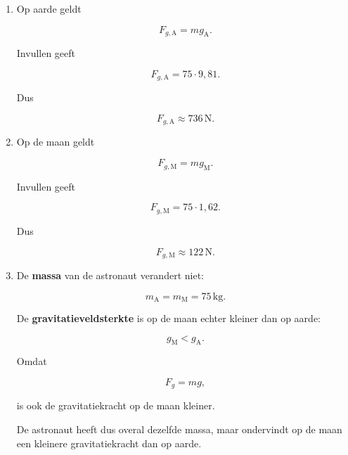\documentclass{ximera}
\begin{document}
\begin{oefening}{\oefB\ESS}
\begin{oplossing}
\begin{enumerate}
      
      \item
      Op aarde geldt
      
      \[
      F_{g,\mathrm A}
      =
      mg_{\mathrm A}.
      \]
      
      Invullen geeft
      
      \[
      F_{g,\mathrm A}
      =
      75\cdot9{,}81.
      \]
      
      Dus
      
      \[
      \boxed{
      F_{g,\mathrm A}
      \approx736\,\mathrm N.
      }
      \]
      
      
      \item
      Op de maan geldt
      
      \[
      F_{g,\mathrm M}
      =
      mg_{\mathrm M}.
      \]
      
      Invullen geeft
      
      \[
      F_{g,\mathrm M}
      =
      75\cdot1{,}62.
      \]
      
      Dus
      
      \[
      \boxed{
      F_{g,\mathrm M}
      \approx122\,\mathrm N.
      }
      \]
      
      
      \item
      De \textbf{massa} van de astronaut verandert niet:
      
      \[
      \boxed{
      m_{\mathrm A}=m_{\mathrm M}=75\,\mathrm{kg}.
      }
      \]
      
      De \textbf{gravitatieveldsterkte} is op de maan echter kleiner dan
      op aarde:
      
      \[
      g_{\mathrm M}<g_{\mathrm A}.
      \]
      
      Omdat
      
      \[
      F_g=mg,
      \]
      
      is ook de gravitatiekracht op de maan kleiner.
      
      De astronaut heeft dus overal dezelfde massa, maar ondervindt op de
      maan een kleinere gravitatiekracht dan op aarde.
      
      \end{enumerate}
      
      \end{oplossing}

\end{oefening}


\end{document}
